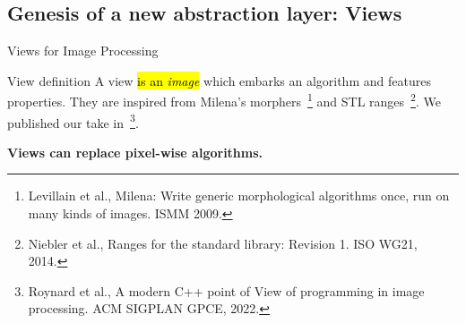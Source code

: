 \documentclass[12pt,aspectratio=169]{beamer}
\makeatletter
\let\HL\hl
\renewcommand\hl{%
  \let\set@color\beamerorig@set@color
  \let\reset@color\beamerorig@reset@color
  \HL}
\makeatother
\begin{document}
\subsection{Genesis of a new abstraction layer: Views}

\begin{frame}[fragile]{Views for Image Processing}
  \begin{alertblock}{View definition}
    A view \hl{is an \emph{image}} which embarks an algorithm and features properties. They are inspired from Milena's
    morphers~\footnote{Levillain et al., Milena: Write generic morphological algorithms once, run on many kinds of
      images. ISMM 2009.} and STL ranges~\footnote{Niebler et al., Ranges for the standard library: Revision 1. ISO WG21,
      2014.}. We published our take in~\footnote{Roynard et al., A modern C++ point of View of programming in image
      processing. ACM SIGPLAN GPCE, 2022.}.
    
  \end{alertblock}
  \begin{center}\textbf{Views can replace pixel-wise algorithms.}\end{center}
  \pdfcomment[icon=Note]{   }
  \pdfcomment[icon=Note]{   }
  \pdfcomment[icon=Note]{   }
\end{frame}

\end{document}
